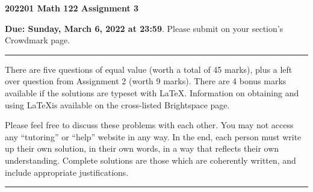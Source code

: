 \documentclass[11 pt]{article}%
\begin{document}
\begin{center}
\textbf{{\Large 202201 Math 122 Assignment 3}}
\end{center}

\medskip\noindent\textbf{Due:  Sunday, March 6, 2022 at 23:59}.  Please submit on your section's Crowdmark page.

\bigskip\hrule\medskip\noindent There are five questions of equal value (worth a total of 45 marks), plus a left over question from Assignment 2 (worth 9 marks).   There are 4 bonus marks available if the solutions are typeset with \LaTeX.  Information on obtaining and using \LaTeX is available on the cross-listed Brightspace page.

\medskip\noindent
Please feel free to discuss these problems with each other.  
You may not  access  any ``tutoring'' or ``help'' website in any way. 
In the end, each person must write up their own solution, in their own words, in a way that reflects their own understanding.   Complete solutions are those which are coherently written, and include appropriate justifications.


\medskip\hrule
\end{document}
